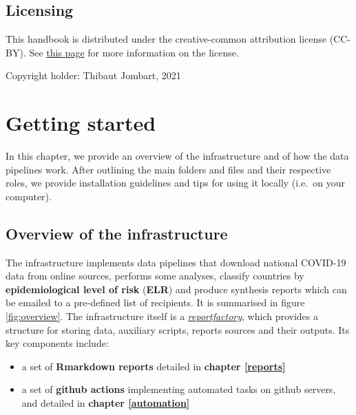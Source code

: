 \documentclass[]{book}
\providecommand{\tightlist}{%
  \setlength{\itemsep}{0pt}\setlength{\parskip}{0pt}}
\begin{document}
\hypertarget{licensing}{%
\section{Licensing}\label{licensing}}

This handbook is distributed under the creative-common attribution license
(CC-BY). See \href{https://creativecommons.org/licenses/by/2.0/}{this page} for more
information on the license.

Copyright holder: Thibaut Jombart, 2021

\hypertarget{getting-started}{%
\chapter{Getting started}\label{getting-started}}

In this chapter, we provide an overview of the infrastructure and of how the
data pipelines work. After outlining the main folders and files and their
respective roles, we provide installation guidelines and tips for using it
locally (i.e.~on your computer).

\hypertarget{overview-of-the-infrastructure}{%
\section{Overview of the infrastructure}\label{overview-of-the-infrastructure}}

The infrastructure implements data pipelines that download national COVID-19
data from online sources, performs some analyses, classify countries by
\textbf{epidemiological level of risk} (\textbf{ELR}) and produce synthesis reports which
can be emailed to a pre-defined list of recipients. It is summarised in figure
\ref{fig:overview}. The infrastructure itself is a
\href{https://www.reconverse.org/reportfactory/}{\emph{reportfactory}}, which provides a
structure for storing data, auxiliary scripts, reports sources and their
outputs. Its key components include:

\begin{itemize}
\tightlist
\item
  a set of \textbf{Rmarkdown reports} detailed in \textbf{chapter \ref{reports}}
\item
  a set of \textbf{github actions} implementing automated tasks on github servers, and
  detailed in \textbf{chapter \ref{automation}}
\end{itemize}
\end{document}
